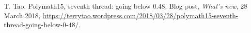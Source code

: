  T. Tao. Polymath15, seventh thread: going below 0.48. Blog post, \emph{What's new}, 28 March 2018, \url{https://terrytao.wordpress.com/2018/03/28/polymath15-seventh-thread-going-below-0-48/}. %
